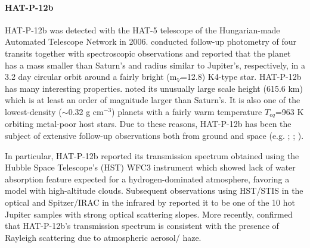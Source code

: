 \paragraph{HAT-P-12b}
HAT-P-12b was detected with the HAT-5 telescope of the Hungarian-made Automated Telescope Network %
in 2006. \cite{Hartmann2009} %
conducted follow-up photometry of four transits together with
spectroscopic observations and reported that the planet has a mass smaller than Saturn's and radius similar to Jupiter's, respectively, in a 3.2 day circular orbit around a fairly bright (m$_V$=12.8) K4-type star. 
HAT-P-12b has many interesting properties. \cite{Hartmann2009} noted its unusually large scale height (615.6 km) which is at least an order of magnitude larger than Saturn's. It is also one of the lowest-density ($\sim$0.32 g cm$^{-3}$) planets with a fairly warm temperature $T_{eq}$=963 K %
orbiting metal-poor host stars. Due to these reasons, HAT-P-12b has been the subject of extensive follow-up observations both from ground and space (e.g. \cite{Lee2012}; \cite{Todorov2013}; \cite{Sing2016}). %

In particular, HAT-P-12b reported \cite{Line2013} its transmission spectrum obtained using the Hubble Space Telescope's (HST) WFC3 instrument which showed lack of water absorption feature expected for a hydrogen-dominated atmosphere, favoring a model with high-altitude clouds. Subsequent observations using HST/STIS in the optical and Spitzer/IRAC in the infrared by \cite{Sing2016} reported it to be one of the 10 hot Jupiter samples with strong optical scattering slopes. More recently, \cite{Barstow2017} confirmed that HAT-P-12b's transmission spectrum is consistent with the presence of Rayleigh scattering due to atmospheric aerosol/ haze. 

